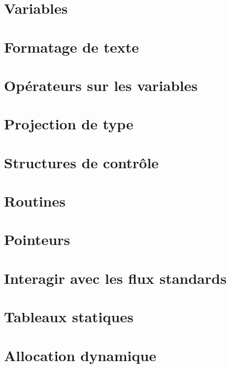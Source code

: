 \documentclass{minitelreport}
\begin{document}
\begin{refsection}
		\section{Variables}
			\label{sec:variables}
			
		\section{Formatage de texte}
			\label{sec:formatage_du_texte}
			
		\section{Opérateurs sur les variables}
			\label{sec:operateurs_variables}
			
		\section{Projection de type}
			\label{sec:projection_type}
			
		\section{Structures de contrôle}
			\label{sec:structures_controle}
			
		\section{Routines}
			\label{sec:routines}
			
		\section{Pointeurs}
			\label{sec:pointeurs}
			
		\section{Interagir avec les flux standards}
			\label{sec:flux_standards}
			
		\section{Tableaux statiques}
			\label{sec:tableaux_statiques}
			
		\section{Allocation dynamique}
			\label{sec:allocation_dynamique}
			

\end{refsection}
\end{document}
